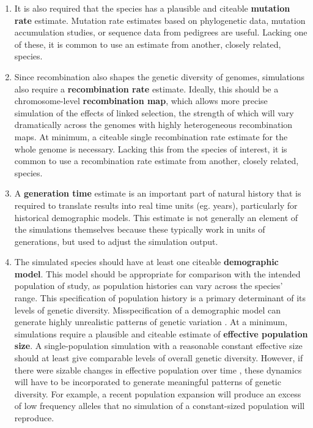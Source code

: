 \documentclass[hidelinks]{article}
\begin{document}
\begin{enumerate}
\item
  It is also required that the species has a plausible and citeable
  \textbf{mutation rate} estimate. Mutation rate estimates based on phylogenetic
  data, mutation accumulation studies, or sequence data from pedigrees are
  useful. Lacking one of these, it is common to use an estimate from
  another, closely related, species.
\item
  Since recombination also shapes the genetic diversity of genomes,
  simulations also require a \textbf{recombination rate} estimate.
  Ideally, this should be a chromosome-level \textbf{recombination map}, which
  allows more precise simulation of the effects of linked selection, the
  strength of which will vary dramatically across the genomes with highly
  heterogeneous recombination maps. At minimum, a citeable single recombination rate
  estimate for the whole genome is necessary. Lacking this from the species
  of interest, it is common to use a recombination rate estimate from
  another, closely related, species.
\item
  A \textbf{generation time} estimate is an important part of natural
  history that is required to translate results into real time units
  (eg. years), particularly for historical demographic models. This
  estimate is not generally an element of the simulations
  themselves because these typically work in units of generations, but
  used to adjust the simulation output.
\item
  The simulated species should have at least one citeable
  \textbf{demographic model}. This model should be appropriate for
  comparison with the intended population of study, as population
  histories can vary across the species' range. This specification of
  population history is a primary determinant of its levels of genetic
  diversity. Misspecification of a demographic model can generate highly
  unrealistic patterns of genetic variation \citep[e.g.,][]{Navascues2009}. At a
  minimum, simulations require a plausible and citeable estimate of 
  \textbf{effective population size}. A single-population simulation with a
  reasonable constant effective size should at least give comparable levels of
  overall genetic diversity. However, if there were sizable changes in
  effective population over time \citep{MacLeod2013}, these dynamics
  will have to be incorporated to generate meaningful patterns of
  genetic diversity. For example, a recent population expansion will produce
  an excess of low frequency alleles that no simulation of a constant-sized
  population will reproduce.
\end{enumerate}
\end{document}
